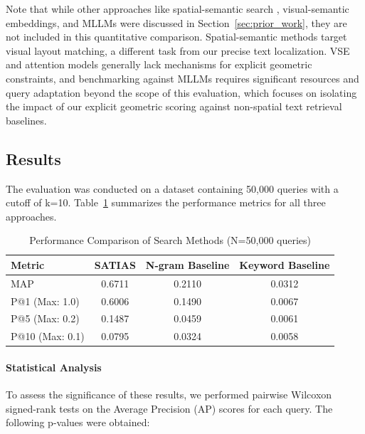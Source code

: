 \documentclass[sigconf,screen]{acmart}
\begin{document}
Note that while other approaches like spatial-semantic search \cite{Mai17}, visual-semantic embeddings, and MLLMs \cite{Huang24, Yin24} were discussed in Section~\ref{sec:prior_work}, they are not included in this quantitative comparison. Spatial-semantic methods target visual layout matching, a different task from our precise text localization. VSE and attention models generally lack mechanisms for explicit geometric constraints, and benchmarking against MLLMs requires significant resources and query adaptation beyond the scope of this evaluation, which focuses on isolating the impact of our explicit geometric scoring against non-spatial text retrieval baselines.

\subsection{Results}
\label{sec:results}

The evaluation was conducted on a dataset containing 50,000 queries with a cutoff of k=10. Table~\ref{tab:results} summarizes the performance metrics for all three approaches.

\begin{table}[t]
    \centering
    \caption{Performance Comparison of Search Methods (N=50,000 queries)}
    \label{tab:results}
    \begin{tabular}{lccc}
        \toprule
        \textbf{Metric} & \textbf{SATIAS} & \textbf{N-gram Baseline} & \textbf{Keyword Baseline} \\
        \midrule
        MAP             & 0.6711          & 0.2110                   & 0.0312                    \\
        \midrule %
        P@1 (Max: 1.0)  & 0.6006          & 0.1490                   & 0.0067                    \\
        P@5 (Max: 0.2)  & 0.1487          & 0.0459                   & 0.0061                    \\
        P@10 (Max: 0.1) & 0.0795          & 0.0324                   & 0.0058                    \\
        \bottomrule
    \end{tabular}
\end{table}

\paragraph{Statistical Analysis}

To assess the significance of these results, we performed pairwise Wilcoxon signed-rank tests on the Average Precision (AP) scores for each query. The following p-values were obtained:
\end{document}
